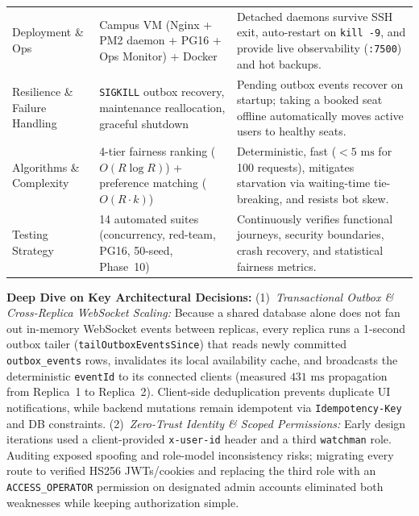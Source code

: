 \documentclass[manuscript,screen,review]{acmart}
\begin{document}
\begin{table}[t]
\begin{tabularx}{\textwidth}{@{}p{}p{}X@{}}
    Deployment \& Ops & Campus VM (Nginx + PM2 daemon + PG16 + Ops Monitor) + Docker & Detached daemons survive SSH exit, auto-restart on \texttt{kill -9}, and provide live observability (\texttt{:7500}) and hot backups. \\
    Resilience \& Failure Handling & \texttt{SIGKILL} outbox recovery, maintenance reallocation, graceful shutdown & Pending outbox events recover on startup; taking a booked seat offline automatically moves active users to healthy seats. \\
    Algorithms \& Complexity & 4-tier fairness ranking ($O(R\log R)$) + preference matching ($O(R\cdot k)$) & Deterministic, fast ($<5\text{ ms}$ for 100 requests), mitigates starvation via waiting-time tie-breaking, and resists bot skew. \\
    Testing Strategy & 14 automated suites (concurrency, red-team, PG16, 50-seed, Phase~10) & Continuously verifies functional journeys, security boundaries, crash recovery, and statistical fairness metrics. \\
    \bottomrule
  \end{tabularx}
\end{table}

\textbf{Deep Dive on Key Architectural Decisions:}
(1)~\textit{Transactional Outbox \& Cross-Replica WebSocket Scaling:} Because a shared database alone does not fan out in-memory WebSocket events between replicas, every replica runs a 1-second outbox tailer (\texttt{tailOutboxEventsSince}) that reads newly committed \texttt{outbox\_events} rows, invalidates its local availability cache, and broadcasts the deterministic \texttt{eventId} to its connected clients (measured $431\text{ ms}$ propagation from Replica~1 to Replica~2). Client-side deduplication prevents duplicate UI notifications, while backend mutations remain idempotent via \texttt{Idempotency-Key} and DB constraints.
(2)~\textit{Zero-Trust Identity \& Scoped Permissions:} Early design iterations used a client-provided \texttt{x-user-id} header and a third \texttt{watchman} role. Auditing exposed spoofing and role-model inconsistency risks; migrating every route to verified HS256 JWTs/cookies and replacing the third role with an \texttt{ACCESS\_OPERATOR} permission on designated admin accounts eliminated both weaknesses while keeping authorization simple.

\end{document}
